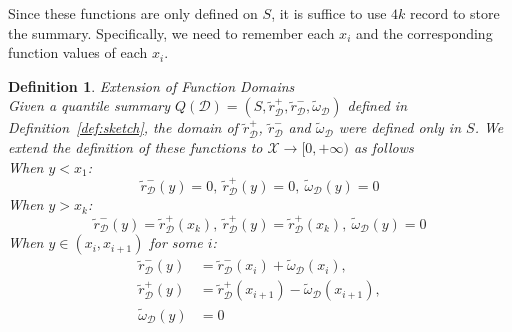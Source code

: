 \documentclass{sig-alternate-05-2015}
\newcommand{\Rplus}{[0, +\infty)}
\newcommand{\sX}{\mathcal{X}}
\newcommand{\sD}{\mathcal{D}}
\newcommand{\tdr}{\tilde{r}_{\sD}}
\newcommand{\tdw}{\tilde{\omega}_{\sD}}
\newtheorem{thm:def}{Definition}[section]
\begin{document}
Since these functions are only defined on $S$, it is suffice to use $4 k$ record to store the summary. Specifically, we need to remember each $x_i$ and the corresponding function values of each $x_i$.

\begin{thm:def}\label{def:extend}{Extension of Function Domains}\\
Given a quantile summary $Q(\sD) = (S, \tdr^+, \tdr^-, \tdw)$ defined in Definition~\ref{def:sketch}, the domain of $\tdr^+$, $\tdr^-$ and $\tdw$ were defined only in $S$. We extend the definition of these functions to $\sX \rightarrow \Rplus$ as follows \\
\noindent When $y < x_1$:
\begin{equation}
    \tdr^-(y) = 0, \  \tdr^+(y) = 0,\   \tdw(y) = 0
\end{equation}
\noindent When $y > x_k$:
\begin{equation}
    \tdr^-(y) = \tdr^+(x_k), \  \tdr^+(y) = \tdr^+(x_k),\   \tdw(y) = 0
\end{equation}
\noindent When $y \in (x_i, x_{i+1})$ for some $i$:
\begin{equation}
\begin{split}
    \tdr^-(y)& =\tdr^-(x_i)+\tdw(x_i), \\
      \tdr^+(y)& = \tdr^+(x_{i+1}) - \tdw(x_{i+1}),\\   \tdw(y)& = 0
\end{split}
\end{equation}
\end{thm:def}
\end{document}

